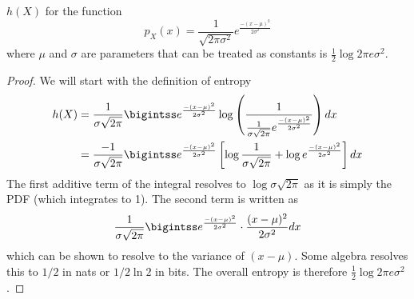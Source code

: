 \documentclass[11pt]{article}
\theoremstyle{definition}
\begin{document}
\theorem $h(X)$ for the function 
\begin{equation*}
p_X(x) = \frac{1}{\sqrt{2\pi\sigma^2}}e^{\frac{-(x - \mu)^2}{2\sigma^2}}
\end{equation*}
where $\mu$ and $\sigma$ are parameters that can be treated as constants is $\frac{1}{2} \log 2 \pi e \sigma^2$.

\begin{proof}
We will start with the definition of entropy 
\begin{align*}
h(X) &= \frac{1}{\sigma \sqrt{2\pi}} \bigintss e^{\frac{-(x - \mu)^2}{2 \sigma^2}} \log \left( \frac{1}{\frac{1}{\sigma \sqrt{2 \pi}} e^{\frac{-(x - \mu)^2}{2 \sigma^2}}} \right) dx \\
 &=   \frac{-1}{\sigma \sqrt{2\pi}} \bigintss e^{\frac{-(x - \mu)^2}{2 \sigma^2}} \left[ \log \frac{1}{\sigma \sqrt{2\pi}} + \log e^{\frac{-(x - \mu)^2}{2 \sigma^2}} \right] dx
\end{align*}
The first additive term of the integral resolves to $\log \sigma \sqrt{2\pi}$ as it is simply the PDF (which integrates to 1). The second term is written as
\begin{align*}
\frac{1}{\sigma \sqrt{2\pi}} \bigintss e^{\frac{-(x - \mu)^2}{2 \sigma^2}} \cdot \frac{(x-\mu)^2}{2\sigma^2} dx
\end{align*}
which can be shown to resolve to the variance of $(x-\mu)$. Some algebra resolves this to $1/2$ in nats or $1/2\ln 2$ in bits. The overall entropy is therefore $\frac{1}{2} \log 2 \pi e \sigma^2$. 
\end{proof}
\end{document}
